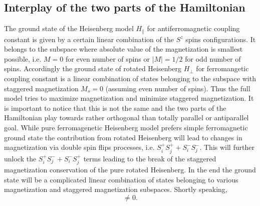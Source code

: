 \documentclass[12pt, a4paper]{article}
\begin{document}
\subsection{Interplay of the two parts of the Hamiltonian}
The ground state of the Heisenberg model $H_{\parallel}$ for antiferromagnetic coupling constant is given by a certain linear combination of the $S^z$ spins configurations. It belongs to the subspace where absolute value of the magnetization is smallest possible, i.e. $M = 0$ for even number of spins or $|M| = 1/2$ for odd number of spins. Accordingly the ground state of rotated Heisenberg $H_{\perp}$ for ferromangetic coupling constant is a linear combination of states belonging to the subspace with staggered magnetization $M_s = 0$ (assuming even number of spins). Thus the full model tries to maximize magnetization and minimize staggered magnetization. It is important to notice that this is not the same and the two parts of the Hamiltonian play towards rather orthogonal than totally parallel or antiparallel goal. While pure ferromagenetic Heisenberg model prefers simple ferromagnetic ground state the contribution from rotated Heisenberg will lead to changes in magnetization via double spin flips processes, i.e. $S_i^+ S_j^+ + S_i^- S_j^-$. This will further unlock the $S_i^+ S_j^- + S_i^- S_j^+$ terms leading to the break of the staggered magnetization conservation of the pure rotated Heisenberg. In the end the ground state will be a complicated linear combination of states belonging to various magnetization and staggered magnetization subspaces. Shortly speaking,
\begin{equation}
[H_{\parallel}, H_{\perp}] \neq 0.
\end{equation}
\end{document}
